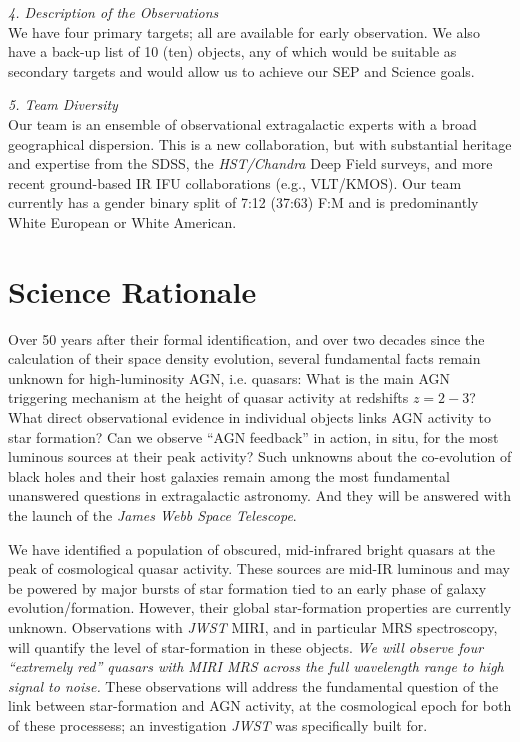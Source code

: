 \smallskip 
\smallskip \smallskip
\noindent
{\it 4. Description of the Observations}\\
We have four primary targets; all are available for early observation.
We also have a back-up list of 10 (ten) objects, any of which would be
suitable as secondary targets and would allow us to achieve our SEP
and Science goals.


\smallskip 
\smallskip \smallskip
\noindent
{\it 5. Team Diversity}\\
Our team is an ensemble of observational extragalactic experts with a
broad geographical dispersion. This is a new collaboration, but with
substantial heritage and expertise from the SDSS, the {\it
HST/Chandra} Deep Field surveys, and more recent ground-based IR IFU
collaborations (e.g., VLT/KMOS).  Our team currently has a gender binary split
of 7:12 (37:63) F:M and is predominantly White European or White American.


\section*{Science Rationale}
\vspace{-6pt}
\noindent
Over 50 years after their formal identification, and over two decades
since the calculation of their space density evolution, several
fundamental facts remain unknown for high-luminosity AGN,
i.e. quasars: What is the main AGN triggering mechanism at the height
of quasar activity at redshifts $z=2-3$? What direct observational
evidence in individual objects links AGN activity to star formation?
Can we observe ``AGN feedback'' in action, in situ, for the most
luminous sources at their peak activity?  Such unknowns about the
co-evolution of black holes and their host galaxies remain among the
most fundamental unanswered questions in extragalactic astronomy.  And
they will be answered with the launch of the {\it James Webb Space
Telescope}.

\smallskip \smallskip
\noindent
We have identified a population of obscured, mid-infrared bright
quasars at the peak of cosmological quasar activity.  These sources
are mid-IR luminous and may be powered by major bursts of star
formation tied to an early phase of galaxy
evolution/formation. However, their global star-formation properties
are currently unknown.  Observations with {\it JWST} MIRI, and in
particular MRS spectroscopy, will quantify the level of star-formation
in these objects.  {\it We will observe four ``extremely red'' quasars
with MIRI MRS across the full wavelength range to high signal to
noise.} These observations will address the fundamental question of
the link between star-formation and AGN activity, at the cosmological
epoch for both of these processess; an investigation {\it JWST} was
specifically built for.


